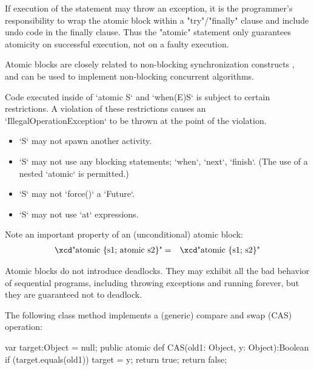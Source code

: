 If execution of the statement may throw an exception, it is
the programmer's responsibility to wrap the atomic block within a
\xcd"try"/\xcd"finally" clause and include undo code in the finally
clause. Thus the \xcd"atomic" statement only guarantees atomicity on
successful execution, not on a faulty execution.




Atomic blocks are closely related to non-blocking synchronization
constructs \cite{herlihy91waitfree}, and can be used to implement 
non-blocking concurrent algorithms.

Code executed inside of \xcd`atomic S` and \xcd`when(E)S` is subject
to certain restrictions. A violation of these restrictions causes an 
\xcd`IllegalOperationException` to be thrown at the point of the violation.

\begin{itemize}
\item \xcd`S` may not spawn another activity.
\item \xcd`S` may not use any blocking statements; \xcd`when`, \xcd`next`,
      \xcd`finish`.  (The use of a nested \xcd`atomic` is permitted.)
\item \xcd`S` may not \xcd`force()` a \xcd`Future`. 
\item \xcd`S` may not use \xcd`at` expressions.
\end{itemize}




Note an important property of an (unconditional) atomic block:
\begin{eqnarray}
\mbox{\xcd"atomic \{s1; atomic s2\}"} &=& \mbox{\xcd"atomic \{s1; s2\}"}
\end{eqnarray}

Atomic blocks do not introduce deadlocks.    They may exhibit all the bad
behavior of sequential programs, including throwing exceptions and running
forever, but they are guaranteed not to deadlock.



\begin{ex}
The following class method implements a (generic) compare and swap (CAS) operation:


\begin{xten}
var target:Object = null;
public atomic def CAS(old1: Object, y: Object):Boolean {
   if (target.equals(old1)) {
     target = y;
     return true;
   }
   return false;
}
\end{xten}
\end{ex}


